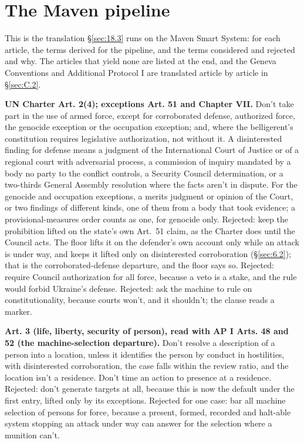 \section{The Maven pipeline}
\label{sec:C.1}
This is the translation \S\ref{sec:18.3} runs on the Maven Smart System: for each article, the terms derived for the pipeline, and the terms considered and rejected and why. The articles that yield none are listed at the end, and the Geneva Conventions and Additional Protocol I are translated article by article in \S\ref{sec:C.2}.


\textbf{UN Charter Art. 2(4); exceptions Art. 51 and Chapter VII.} Don't take part in the use of armed force, except for corroborated defense, authorized force, the genocide exception or the occupation exception; and, where the belligerent's constitution requires legislative authorization, not without it. A disinterested finding for defense means a judgment of the International Court of Justice or of a regional court with adversarial process, a commission of inquiry mandated by a body no party to the conflict controls, a Security Council determination, or a two-thirds General Assembly resolution where the facts aren't in dispute. For the genocide and occupation exceptions, a merits judgment or opinion of the Court, or two findings of different kinds, one of them from a body that took evidence; a provisional-measures order counts as one, for genocide only. Rejected: keep the prohibition lifted on the state's own Art.~51 claim, as the Charter does until the Council acts. The floor lifts it on the defender's own account only while an attack is under way, and keeps it lifted only on disinterested corroboration (\S\ref{sec:6.2}); that is the corroborated-defense departure, and the floor says so. Rejected: require Council authorization for all force, because a veto is a stake, and the rule would forbid Ukraine's defense. Rejected: ask the machine to rule on constitutionality, because courts won't, and it shouldn't; the clause reads a marker.

\textbf{Art. 3 (life, liberty, security of person), read with AP I Arts. 48 and 52 (the machine-selection departure).} Don't resolve a description of a person into a location, unless it identifies the person by conduct in hostilities, with disinterested corroboration, the case falls within the review ratio, and the location isn't a residence. Don't time an action to presence at a residence. Rejected: don't generate targets at all, because this is now the default under the first entry, lifted only by its exceptions. Rejected for one case: bar all machine selection of persons for force, because a present, formed, recorded and halt-able system stopping an attack under way can answer for the selection where a munition can't.

